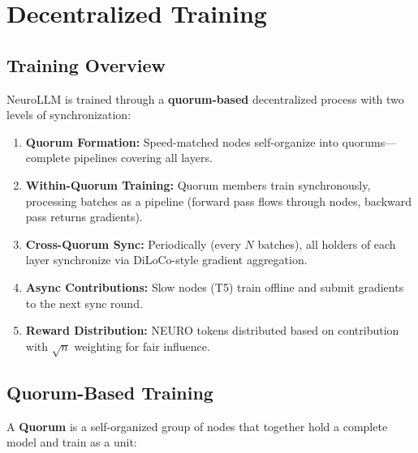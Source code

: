\documentclass[11pt,a4paper]{article}
\begin{document}
\section{Decentralized Training}

\subsection{Training Overview}

NeuroLLM is trained through a \textbf{quorum-based} decentralized process with two levels of synchronization:

\begin{enumerate}
    \item \textbf{Quorum Formation:} Speed-matched nodes self-organize into quorums---complete pipelines covering all layers.
    \item \textbf{Within-Quorum Training:} Quorum members train synchronously, processing batches as a pipeline (forward pass flows through nodes, backward pass returns gradients).
    \item \textbf{Cross-Quorum Sync:} Periodically (every $N$ batches), all holders of each layer synchronize via DiLoCo-style gradient aggregation.
    \item \textbf{Async Contributions:} Slow nodes (T5) train offline and submit gradients to the next sync round.
    \item \textbf{Reward Distribution:} NEURO tokens distributed based on contribution with $\sqrt{n}$ weighting for fair influence.
\end{enumerate}

\subsection{Quorum-Based Training}

A \textbf{Quorum} is a self-organized group of nodes that together hold a complete model and train as a unit:
\end{document}
